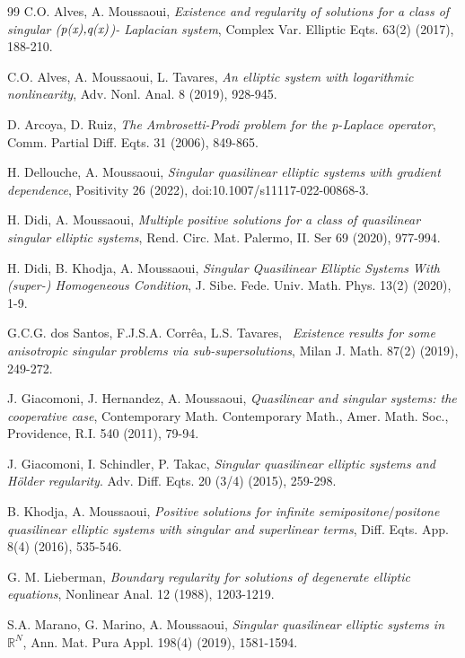 \documentclass[11pt]{amsart}
\theoremstyle{definition}
\theoremstyle{remark}
\numberwithin{equation}{section}
\begin{document}
\begin{thebibliography}{99}
 C.O. Alves, A. Moussaoui, \emph{Existence and regularity of
solutions for a class of singular (}$\emph{p(x),q(x)}$\emph{)- Laplacian
system}, Complex Var. Elliptic Eqts. 63(2) (2017), 188-210.

 C.O. Alves, A. Moussaoui, L. Tavares, \emph{An elliptic system
with logarithmic nonlinearity}, Adv. Nonl. Anal. 8 (2019), 928-945.

 D. Arcoya, D. Ruiz, \emph{The Ambrosetti-Prodi problem for the
p-Laplace operator}, Comm. Partial Diff. Eqts. 31 (2006), 849-865.

 H. Dellouche, A. Moussaoui, \emph{Singular quasilinear elliptic
systems with gradient dependence}, Positivity 26 (2022),
doi:10.1007/s11117-022-00868-3.

 H. Didi, A. Moussaoui, \emph{Multiple positive solutions for a
class of quasilinear singular elliptic systems}, Rend. Circ. Mat. Palermo,
II. Ser 69 (2020), 977-994.

 H. Didi, B. Khodja, A. Moussaoui, \emph{Singular Quasilinear
Elliptic Systems With (super-) Homogeneous Condition}, J. Sibe. Fede. Univ.
Math. Phys. 13(2) (2020), 1-9.

 G.C.G. dos Santos, F.J.S.A. Corr\^{e}a, L.S. Tavares, \emph{\
Existence results for some anisotropic singular problems via
sub-supersolutions}, Milan J. Math. 87(2) (2019), 249-272.

 J. Giacomoni, J. Hernandez, A. Moussaoui, \emph{Quasilinear
and singular systems: the cooperative case}, Contemporary Math. Contemporary
Math., Amer. Math. Soc., Providence, R.I. 540 (2011), 79-94.

 J. Giacomoni, I. Schindler, P. Takac, \emph{Singular
quasilinear elliptic systems and H\"{o}lder regularity}. Adv. Diff. Eqts. 20
(3/4) (2015), 259-298.

 B. Khodja, A. Moussaoui, \emph{Positive solutions for infinite
semipositone}$/$\emph{positone quasilinear elliptic systems with singular
and superlinear terms}, Diff. Eqts. App. 8(4) (2016), 535-546.

 G. M. Lieberman, \emph{Boundary regularity for solutions of
degenerate elliptic equations}, Nonlinear Anal. 12 (1988), 1203-1219.

 S.A. Marano, G. Marino, A. Moussaoui, \emph{Singular
quasilinear elliptic systems in}\textit{\ }$%
\mathbb{R}
^{N}$, Ann. Mat. Pura Appl. 198(4) (2019), 1581-1594.


\end{thebibliography}
\end{document}
